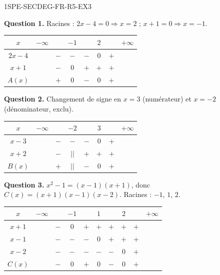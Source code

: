 \begin{corrige}{1SPE-SECDEG-FR-R5-EX3}

\textbf{Question 1.} Racines : $2x - 4 = 0 \Rightarrow x = 2$ ; $x + 1 = 0 \Rightarrow x = -1$.

\begin{center}
\begin{tabular}{|c|ccccccc|}
\hline
$x$ & $-\infty$ & & $-1$ & & $2$ & & $+\infty$ \\
\hline
$2x-4$ & & $-$ & $-$ & $-$ & $0$ & $+$ & \\
$x+1$ & & $-$ & $0$ & $+$ & $+$ & $+$ & \\
\hline
$A(x)$ & & $+$ & $0$ & $-$ & $0$ & $+$ & \\
\hline
\end{tabular}
\end{center}

\textbf{Question 2.} Changement de signe en $x = 3$ (numérateur) et $x = -2$ (dénominateur, exclu).

\begin{center}
\begin{tabular}{|c|ccccccc|}
\hline
$x$ & $-\infty$ & & $-2$ & & $3$ & & $+\infty$ \\
\hline
$x - 3$ & & $-$ & $-$ & $-$ & $0$ & $+$ & \\
$x + 2$ & & $-$ & $||$ & $+$ & $+$ & $+$ & \\
\hline
$B(x)$ & & $+$ & $||$ & $-$ & $0$ & $+$ & \\
\hline
\end{tabular}
\end{center}

\textbf{Question 3.} $x^2 - 1 = (x-1)(x+1)$, donc $C(x) = (x+1)(x-1)(x-2)$. Racines : $-1$, $1$, $2$.

\begin{center}
\begin{tabular}{|c|ccccccccc|}
\hline
$x$ & $-\infty$ & & $-1$ & & $1$ & & $2$ & & $+\infty$ \\
\hline
$x+1$ & & $-$ & $0$ & $+$ & $+$ & $+$ & $+$ & $+$ & \\
$x-1$ & & $-$ & $-$ & $-$ & $0$ & $+$ & $+$ & $+$ & \\
$x-2$ & & $-$ & $-$ & $-$ & $-$ & $-$ & $0$ & $+$ & \\
\hline
$C(x)$ & & $-$ & $0$ & $+$ & $0$ & $-$ & $0$ & $+$ & \\
\hline
\end{tabular}
\end{center}

\end{corrige}

